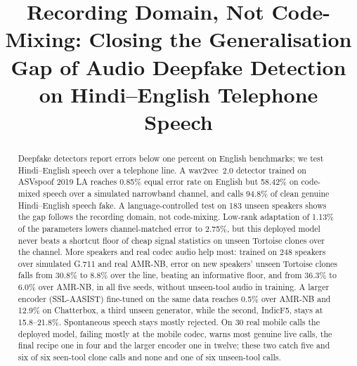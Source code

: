 \documentclass[conference]{IEEEtran}
\begin{document}
\title{Recording Domain, Not Code-Mixing: Closing the Generalisation Gap of
Audio Deepfake Detection on Hindi--English Telephone Speech}

\maketitle

\begin{abstract}
Deepfake detectors report errors below one percent on English benchmarks; we
test Hindi--English speech over a telephone line. A
wav2vec~2.0 detector trained on ASVspoof 2019 LA reaches 0.85\% equal error rate on
English but 58.42\% on code-mixed speech over a simulated narrowband channel, and calls
94.8\% of clean genuine Hindi--English speech fake. A
language-controlled test on 183 unseen speakers shows the gap follows the recording
domain, not code-mixing. Low-rank adaptation of 1.13\% of the parameters lowers
channel-matched error to 2.75\%, but this deployed model never beats a shortcut
floor of cheap signal statistics on unseen Tortoise clones over the channel. More speakers
and real codec audio help most: trained on 248 speakers over simulated G.711 and real AMR-NB,
error on new speakers' unseen Tortoise clones falls from 30.8\% to 8.8\% over the line,
beating an informative floor, and from 36.3\% to 6.0\% over AMR-NB, in all five seeds, without
unseen-tool audio in training. A larger encoder (SSL-AASIST) fine-tuned on the same data
reaches 0.5\% over AMR-NB and 12.9\% on Chatterbox, a third unseen generator, while the
second, IndicF5, stays at 15.8--21.8\%. Spontaneous speech stays mostly rejected. On 30
real mobile calls the deployed model, failing mostly at the mobile codec, warns most genuine
live calls, the final recipe one in four and the larger encoder one in twelve; these two catch
five and six of six seen-tool clone calls and none and one of six unseen-tool calls.
\end{abstract}

\end{document}

